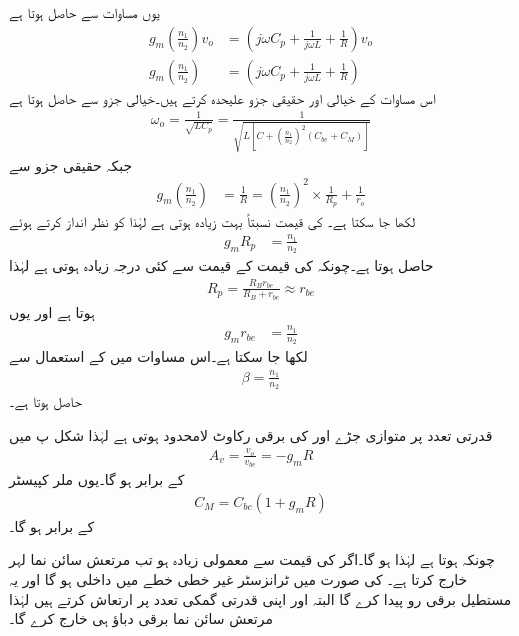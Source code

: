 یوں مساوات  سے حاصل ہوتا ہے 
\begin{align*}
g_m \left(\frac{n_1}{n_2} \right) v_o &=\left(j \omega C_p +\frac{1}{j \omega L} +\frac{1}{R} \right) v_o\\
g_m \left(\frac{n_1}{n_2} \right) &=\left(j \omega C_p +\frac{1}{j \omega L} +\frac{1}{R} \right)
\end{align*}
اس مساوات کے خیالی اور حقیقی جزو علیحدہ کرتے ہیں۔خیالی جزو سے حاصل ہوتا ہے
\begin{align}
\omega_o=\frac{1}{\sqrt{L C_p}}=\frac{1}{\sqrt{L \left[C+\left(\frac{n_1}{n_2}\right)^2 \left(C_{be}+C_M \right) \right]}}
\end{align}
جبکہ حقیقی جزو سے
\begin{align*}
g_m \left ( \frac{n_1}{n_2}\right)&=\frac{1}{R}=\left(\frac{n_1}{n_2} \right)^2  \times \frac{1}{R_p} +\frac{1}{r_o}
\end{align*}
لکھا جا سکتا ہے۔ کی قیمت نسبتاً بہت زیادہ ہوتی ہے لہٰذا  کو نظر انداز کرتے ہوئے
\begin{align*}
g_m R_p&=\frac{n_1}{n_2}
\end{align*}
حاصل ہوتا ہے۔چونکہ  کی قیمت  کے قیمت سے کئی درجہ زیادہ ہوتی ہے لہٰذا
\begin{align*}
R_p=\frac{R_B r_{be}}{R_B+r_{be}} \approx r_{be}
\end{align*}
ہوتا ہے  اور یوں
\begin{align*}
g_m r_{be}&=\frac{n_1}{n_2}
\end{align*}
لکھا جا سکتا ہے۔اس مساوات میں  کے استعمال سے
\begin{align}
\beta = \frac{n_1}{n_2}
\end{align}
حاصل ہوتا ہے۔

قدرتی تعدد  پر متوازی جڑے  اور  کی برقی رکاوٹ لامحدود ہوتی ہے لہٰذا شکل  پ میں
\begin{align}
A_v=\frac{v_o}{v_{be}}=- g_m R 
\end{align}
کے برابر ہو گا۔یوں ملر کپیسٹر
\begin{align*}
C_M=C_{bc} \left(1+g_m R \right)
\end{align*}
کے برابر ہو گا۔

چونکہ  ہوتا ہے لہٰذا  ہو گا۔اگر  کی قیمت  سے معمولی زیادہ ہو تب مرتعش سائن نما لہر خارج کرتا ہے۔ کی صورت میں ٹرانزسٹر غیر خطی خطے میں داخلی ہو گا اور یہ مستطیل برقی رو پیدا کرے گا البتہ  اور  اپنی قدرتی گمکی تعدد  پر ارتعاش کرتے ہیں لہٰذا مرتعش سائن نما برقی دباؤ  ہی خارج کرے گا۔


